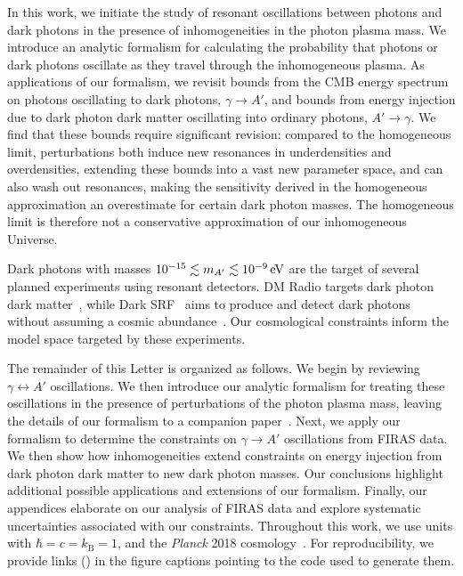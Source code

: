 \documentclass[prd,aps,10pt,nofootinbib,twocolumn,superscriptaddress,preprintnumbers,balancelastpage,longbibliography]{revtex4-1}
\begin{document}
In this work, we initiate the study of resonant oscillations between photons and dark photons in the presence of inhomogeneities in the photon plasma mass.  We introduce an analytic formalism for calculating the probability that photons or dark photons oscillate as they travel through the inhomogeneous plasma.  As applications of our formalism, we revisit bounds from the CMB energy spectrum on photons oscillating to dark photons, $\gamma \rightarrow A'$, and bounds from energy injection due to dark photon dark matter oscillating into ordinary photons, $A' \rightarrow \gamma $.  We find that these bounds require significant revision: compared to the homogeneous limit, perturbations both induce new resonances in underdensities and overdensities, extending these bounds into a vast new parameter space, and can also wash out resonances, making the sensitivity derived in the homogeneous approximation an overestimate for certain dark photon masses. The homogeneous limit is therefore not a conservative approximation of our inhomogeneous Universe.

Dark photons with masses $10^{-15} \lesssim \mAp \lesssim \SI{e-9}{\eV}$ are the target of several planned experiments using resonant detectors. DM Radio targets dark photon dark matter~\cite{Chaudhuri:2014dla,Silva-Feaver:2016qhh}, while Dark SRF~\cite{HarnikSRF,GrassellinoSRF} aims to produce and detect dark photons without assuming a cosmic abundance~\cite{Graham:2014sha}. Our cosmological constraints  inform the model space targeted by these experiments.

The remainder of this Letter is organized as follows.  We begin by reviewing $\gamma \leftrightarrow A'$ oscillations.  We then introduce our analytic formalism for treating these oscillations in the presence of perturbations of the photon plasma mass, leaving the details of our formalism to a companion paper~\cite{OurLongPaper}.  Next, we apply our formalism to determine the constraints on $\gamma \rightarrow A'$ oscillations from FIRAS data.  We then show how inhomogeneities extend constraints on energy injection from dark photon dark matter to new dark photon masses.  Our conclusions highlight additional possible applications and extensions of our formalism. Finally, our appendices elaborate on our analysis of FIRAS data and explore systematic uncertainties associated with our constraints. Throughout this work, we use units with $\hbar = c = k_\mathrm{B} = 1$, and the \textit{Planck} 2018 cosmology~\cite{Aghanim:2019ame}. For reproducibility, we provide links (\nbicon) in the figure captions pointing to the code used to generate them.
\end{document}
